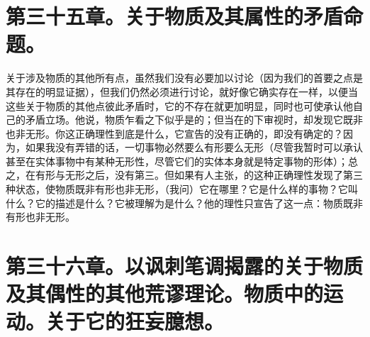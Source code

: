 
\section{第三十五章。关于物质及其属性的矛盾命题。}

关于涉及物质的其他所有点，虽然我们没有必要加以讨论（因为我们的首要之点是其存在的明显证据），但我们仍然必须进行讨论，就好像它确实存在一样，以便当这些关于物质的其他点彼此矛盾时，它的不存在就更加明显，同时也可使承认他自己的矛盾立场。他说，物质乍看之下似乎是的；但当在的下审视时，却发现它既非也非无形。你这正确理性到底是什么，它宣告的没有正确的，即没有确定的？因为，如果我没有弄错的话，一切事物必然要么有形要么无形（尽管我暂时可以承认甚至在实体事物中有某种无形性，尽管它们的实体本身就是特定事物的形体）；总之，在有形与无形之后，没有第三。但如果有人主张，的这种正确理性发现了第三种状态，使物质既非有形也非无形，（我问）它在哪里？它是什么样的事物？它叫什么？它的描述是什么？它被理解为是什么？他的理性只宣告了这一点：物质既非有形也非无形。\par


\section{第三十六章。以讽刺笔调揭露的关于物质及其偶性的其他荒谬理论。物质中的运动。关于它的狂妄臆想。}

